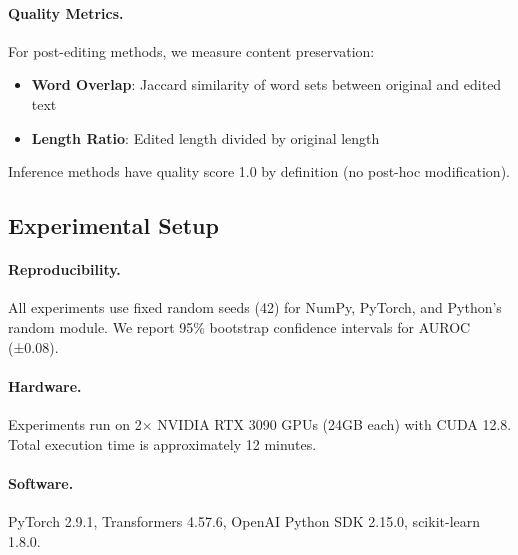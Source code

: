 \paragraph{Quality Metrics.} For post-editing methods, we measure content preservation:
\begin{itemize}
    \item \textbf{Word Overlap}: Jaccard similarity of word sets between original and edited text
    \item \textbf{Length Ratio}: Edited length divided by original length
\end{itemize}
Inference methods have quality score 1.0 by definition (no post-hoc modification).

\subsection{Experimental Setup}

\paragraph{Reproducibility.} All experiments use fixed random seeds (42) for NumPy, PyTorch, and Python's random module. We report 95\% bootstrap confidence intervals for AUROC (±0.08).

\paragraph{Hardware.} Experiments run on 2$\times$ NVIDIA RTX 3090 GPUs (24GB each) with CUDA 12.8. Total execution time is approximately 12 minutes.

\paragraph{Software.} PyTorch 2.9.1, Transformers 4.57.6, OpenAI Python SDK 2.15.0, scikit-learn 1.8.0.
